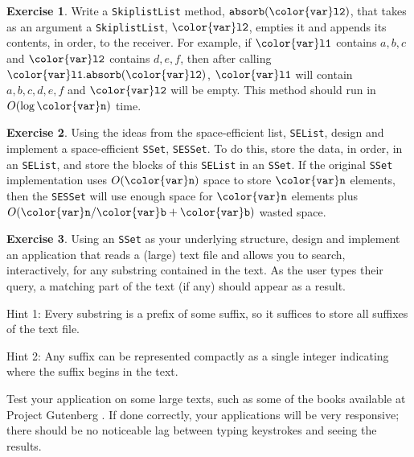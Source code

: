 \documentclass[10pt]{book}
\theoremstyle{plain}
\theoremstyle{definition}
\newtheorem{exc}{Exercise}[chapter]
\begin{document}
\begin{exc}
  Write a \texttt{SkiplistList} method, \ensuremath{\mathtt{absorb({\color{var}l2})}}, that takes as an
  argument a \texttt{SkiplistList}, \ensuremath{\mathtt{{\color{var}l2}}}, empties it and appends its contents,
  in order, to the receiver.  For example, if \ensuremath{\mathtt{{\color{var}l1}}} contains $a,b,c$
  and \ensuremath{\mathtt{{\color{var}l2}}} contains $d,e,f$, then after calling \ensuremath{\mathtt{{\color{var}l1}.absorb({\color{var}l2})}}, \ensuremath{\mathtt{{\color{var}l1}}}
  will contain $a,b,c,d,e,f$ and \ensuremath{\mathtt{{\color{var}l2}}} will be empty. This method should
  run in $O(\log \ensuremath{\mathtt{{\color{var}n}}})$ time.
\end{exc}

\begin{exc}
  Using the ideas from the space-efficient list, \texttt{SEList}, design
  and implement a space-efficient \texttt{SSet}, \texttt{SESSet}.  To do this, store the
  data, in order, in an \texttt{SEList}, and store the blocks of this \texttt{SEList}
  in an \texttt{SSet}. If the original \texttt{SSet} implementation uses $O(\ensuremath{\mathtt{{\color{var}n}}})$
  space to store \ensuremath{\mathtt{{\color{var}n}}} elements, then the \texttt{SESSet} will use enough space
  for \ensuremath{\mathtt{{\color{var}n}}} elements plus $O(\ensuremath{\mathtt{{\color{var}n}}}/\ensuremath{\mathtt{{\color{var}b}}}+\ensuremath{\mathtt{{\color{var}b}}})$ wasted space.
\end{exc}

\begin{exc}
  Using an \texttt{SSet} as your underlying structure, design and implement an
  application that reads a (large) text file and allows you to search,
  interactively, for any substring contained in the text.  As the user
  types their query, a matching part of the text (if any) should appear 
  as a result.

  \noindent  Hint 1: Every substring is a prefix of some suffix, so it
  suffices to store all suffixes of the text file.

  \noindent Hint 2:  Any suffix can be represented compactly as a single
  integer indicating where the suffix begins in the text.

  \noindent Test your application on some large texts, such as some of
  the books available at Project Gutenberg \cite{gutenberg}.  If done
  correctly, your applications will be very responsive; there should be
  no noticeable lag between typing keystrokes and seeing the results.
\end{exc}
\end{document}

